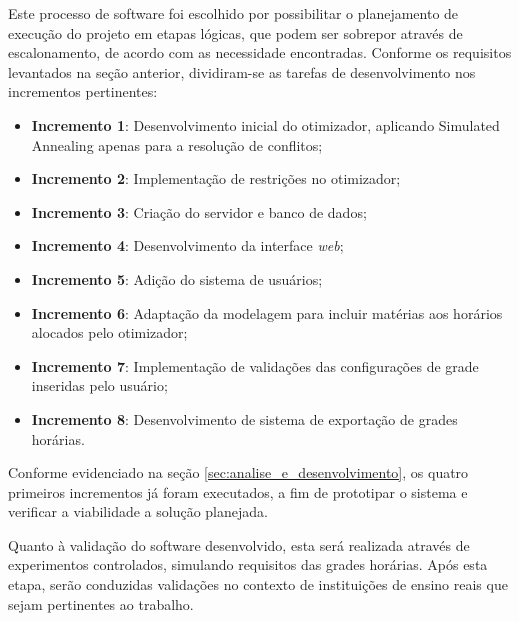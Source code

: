 Este processo de software foi escolhido por possibilitar o planejamento de execução do projeto em etapas lógicas, que podem ser sobrepor através de escalonamento, de acordo com as necessidade encontradas. Conforme os requisitos levantados na seção anterior, dividiram-se as tarefas de desenvolvimento nos incrementos pertinentes:
\begin{itemize}
	\item \textbf{Incremento 1}: Desenvolvimento inicial do otimizador, aplicando Simulated Annealing apenas para a resolução de conflitos;
	\item \textbf{Incremento 2}: Implementação de restrições no otimizador;
	\item \textbf{Incremento 3}: Criação do servidor e banco de dados;
	\item \textbf{Incremento 4}: Desenvolvimento da interface \textit{web};
	\item \textbf{Incremento 5}: Adição do sistema de usuários;
	\item \textbf{Incremento 6}: Adaptação da modelagem para incluir matérias aos horários alocados pelo otimizador;
	\item \textbf{Incremento 7}: Implementação de validações das configurações de grade inseridas pelo usuário;
	\item \textbf{Incremento 8}: Desenvolvimento de sistema de exportação de grades horárias.
\end{itemize}

Conforme evidenciado na seção \ref{sec:analise_e_desenvolvimento}, os quatro primeiros incrementos já foram executados, a fim de prototipar o sistema e verificar a viabilidade a solução planejada.

Quanto à validação do software desenvolvido, esta será realizada através de experimentos controlados, simulando requisitos das grades horárias. Após esta etapa, serão conduzidas validações no contexto de instituições de ensino reais que sejam pertinentes ao trabalho.
